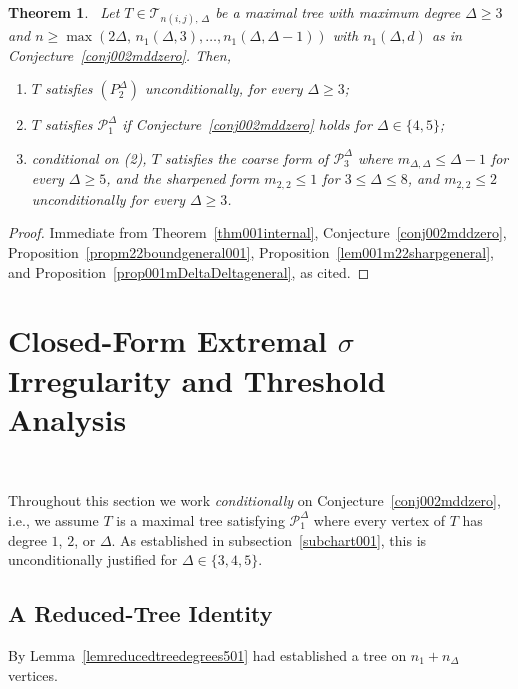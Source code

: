 \documentclass[12pt]{amsart}
\newtheorem{theorem}{Theorem}[section]
\newcommand{\TT}{\mathcal{T}}
\begin{document}
\begin{theorem}~\label{thm03partialgeneral}
Let $T\in \TT_{n(i,j),\,\Delta}$ be a maximal tree with maximum degree $\Delta\geqslant 3$ and
$n\geqslant \max(2\Delta,\,n_1(\Delta,3),\dots,n_1(\Delta,\Delta-1))$ with $n_1(\Delta,d)$ as in Conjecture~\ref{conj002mddzero}. Then,
\begin{enumerate}
\item  $T$ satisfies $(P_2^\Delta)$ unconditionally, for every
$\Delta\geqslant 3$;
\item  $T$ satisfies $\mathcal P_1^\Delta$ if Conjecture~\ref{conj002mddzero}
holds for $\Delta \in \{4,5\}$; 
\item  conditional on (2), $T$ satisfies the coarse form of
$\mathcal P_3^\Delta$ where $m_{\Delta,\Delta}\leqslant \Delta-1$ for every $\Delta\geqslant 5$, and the sharpened form
$m_{2,2}\leqslant 1$ for $3\leqslant \Delta\leqslant 8$, and $m_{2,2}\leqslant 2$ unconditionally for every $\Delta\geqslant 3$.
\end{enumerate}
\end{theorem}
\begin{proof}
Immediate from Theorem~\ref{thm001internal},
Conjecture~\ref{conj002mddzero}, Proposition~\ref{propm22boundgeneral001},
Proposition~\ref{lem001m22sharpgeneral}, and
Proposition~\ref{prop001mDeltaDeltageneral}, as cited.
\end{proof}


\section{Closed-Form Extremal \texorpdfstring{$\sigma$}-Irregularity and Threshold Analysis}~\label{sec04closedform}

Throughout this section we work \emph{conditionally} on
Conjecture~\ref{conj002mddzero}, i.e., we assume $T$ is a maximal tree satisfying $\mathcal P_1^\Delta$ where  every vertex of $T$ has degree $1$, $2$, or $\Delta$. As established in subsection~\ref{subchart001}, this is unconditionally justified for $\Delta\in\{3,4,5\}$.



\subsection{A Reduced-Tree Identity}
By Lemma~\ref{lemreducedtreedegrees501} had established a tree on $n_1+n_\Delta$ vertices.
\end{document}
